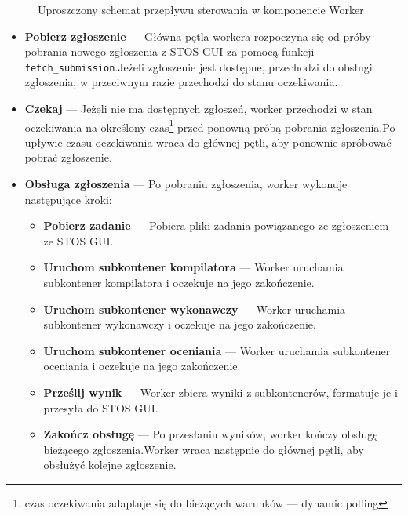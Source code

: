 \documentclass[12pt,a4paper]{article}
\begin{document}
\begin{figure}[H]
    \caption{Uproszczony schemat przepływu sterowania w komponencie Worker}
\end{figure}

\begin{itemize}
    \item \textbf{Pobierz zgłoszenie} --- Główna pętla workera rozpoczyna się od próby pobrania nowego zgłoszenia z STOS GUI za pomocą funkcji \texttt{fetch\_submission}.\@ Jeżeli zgłoszenie jest dostępne, przechodzi do obsługi zgłoszenia; w przeciwnym razie przechodzi do stanu oczekiwania.
    \item \textbf{Czekaj} --- Jeżeli nie ma dostępnych zgłoszeń, worker przechodzi w stan oczekiwania na określony czas\footnote{czas oczekiwania adaptuje się do bieżących warunków --- dynamic polling} przed ponowną próbą pobrania zgłoszenia.\@ Po upływie czasu oczekiwania wraca do głównej pętli, aby ponownie spróbować pobrać zgłoszenie.
    \item \textbf{Obsługa zgłoszenia} --- Po pobraniu zgłoszenia, worker wykonuje następujące kroki:
    \begin{itemize}
        \item \textbf{Pobierz zadanie} --- Pobiera pliki zadania powiązanego ze zgłoszeniem ze STOS GUI.\
        \item \textbf{Uruchom subkontener kompilatora} --- Worker uruchamia subkontener kompilatora i oczekuje na jego zakończenie.
        \item \textbf{Uruchom subkontener wykonawczy} --- Worker uruchamia subkontener wykonawczy i oczekuje na jego zakończenie.
        \item \textbf{Uruchom subkontener oceniania} --- Worker uruchamia subkontener oceniania i oczekuje na jego zakończenie.
        \item \textbf{Prześlij wynik} --- Worker zbiera wyniki z subkontenerów, formatuje je i przesyła do STOS GUI.\
        \item \textbf{Zakończ obsługę} --- Po przesłaniu wyników, worker kończy obsługę bieżącego zgłoszenia.\@ Worker wraca następnie do głównej pętli, aby obsłużyć kolejne zgłoszenie.
    \end{itemize}
\end{itemize}
\end{document}
